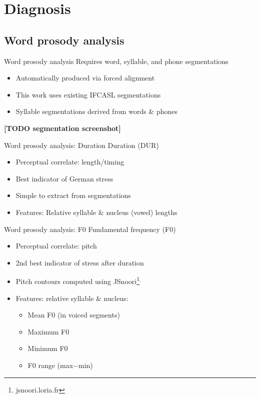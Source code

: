 \documentclass[xcolor={dvipsnames}]{beamer}
\newcommand{\TODO}[1]{{\color{red}\textbf{[TODO #1]}}}
\begin{document}

\section{Diagnosis}
	\subsection{Word prosody analysis}
		\begin{frame}{Word prosody analysis}
		Requires word, syllable, and phone segmentations
			\begin{itemize}
			\item Automatically produced via forced alignment
			\item This work uses existing IFCASL segmentations
			\item Syllable segmentations derived from words \& phones
			\end{itemize}
			
			\TODO{segmentation screenshot}
		\end{frame}
		
		\begin{frame}{Word prosody analysis: Duration}
		Duration (DUR)
			\begin{itemize}
			\item Perceptual correlate: length/timing
			\item Best indicator of German stress
			\item Simple to extract from segmentations
			\item Features: Relative syllable \& nucleus (vowel) lengths
			\end{itemize}
				
		\end{frame}		
		
		\begin{frame}{Word prosody analysis: F0}
		 Fundamental frequency (F0)
			\begin{itemize}
			\item Perceptual correlate: pitch
			\item 2nd best indicator of stress after duration
			\item Pitch contours computed using JSnoori\footnote{jsnoori.loria.fr}$^{,}$
			\item Features: relative syllable \& nucleus:
				\begin{itemize}
				\item Mean F0 (in voiced segments)
				\item Maximum F0
				\item Minimum F0 
				\item F0 range (max$-$min)
				\end{itemize}
			\end{itemize}
		\end {frame}
			
\end{document}
